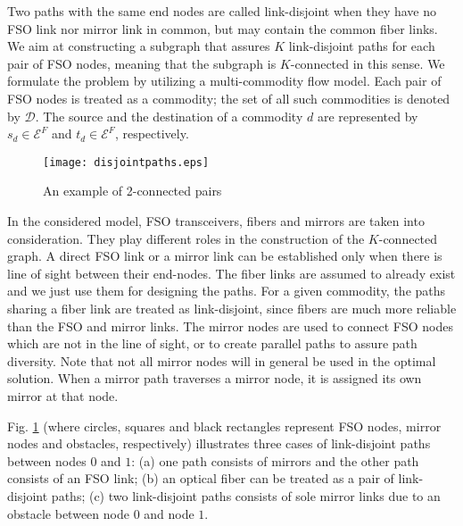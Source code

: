 \documentclass[onecolumn,11pt,draftclsnofoot]{IEEEtran}
\begin{document}
Two paths with the same end nodes are called link-disjoint when they have no FSO link nor mirror link in common, but may contain the common fiber links. We aim at constructing a subgraph that assures $K$ link-disjoint paths for each pair of FSO nodes, meaning that the subgraph is $K$-connected in this sense.
We formulate the problem by utilizing a multi-commodity flow model. Each pair of FSO nodes is treated as a commodity; the set of all such commodities is denoted by $\mathcal D$. The source and the destination of a commodity $d$ are represented by $s_d \in \mathcal E^F$ and $t_d \in \mathcal E^F$, respectively.

\begin{figure}[!htbp]
\centering
\texttt{[image: disjointpaths.eps]}
\caption{An example of 2-connected pairs}
\label{fig:disjointpaths}
\end{figure}

In the considered model, FSO transceivers, fibers and mirrors are taken into consideration. They play different roles in the construction of the $K$-connected graph. A direct FSO link or a mirror link can be established only when there is line of sight between their end-nodes. The fiber links are assumed to already exist and we just use them for designing the paths.
For a given commodity, the paths sharing a fiber link are treated as link-disjoint, since fibers are much more reliable than the FSO and mirror links. The mirror nodes are used to connect FSO nodes which are not in the line of sight, or to create parallel paths to assure path diversity. Note that not all mirror nodes will in general be used in the optimal solution. When a mirror path traverses a mirror node, it is assigned its own mirror at that node.

Fig. \ref{fig:disjointpaths} (where circles, squares and black rectangles represent FSO nodes, mirror nodes and obstacles, respectively) illustrates three cases of link-disjoint paths between nodes $0$ and $1$: (a) one path consists of mirrors and the other path consists of an FSO link; (b) an optical fiber can be treated as a pair of link-disjoint paths; (c) two link-disjoint paths consists of sole mirror links due to an obstacle between node $0$ and node $1$.
\end{document}
